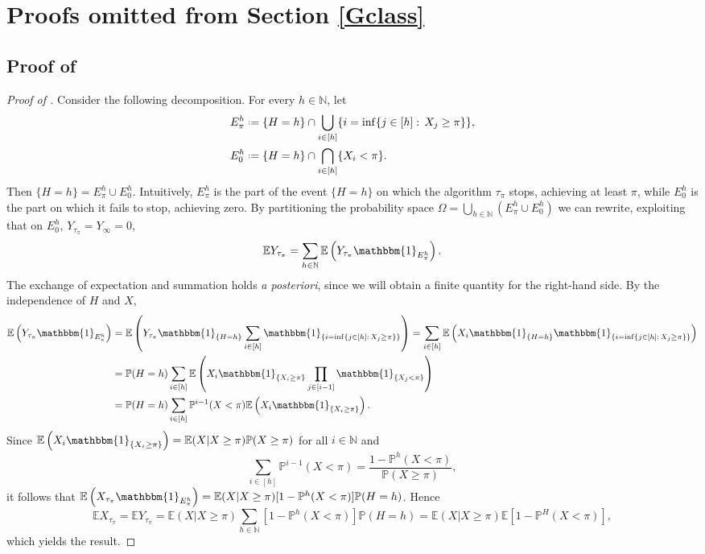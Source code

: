 \documentclass[11pt, a4paper, twoside]{article}
\newcommand*{\defeq}{\mathrel{\vcenter{\baselineskip0.5ex \lineskiplimit0pt
			\hbox{\scriptsize.}\hbox{\scriptsize.}}}=}
\newcommand{\NN}{\mathbb{N}}
\newcommand{\EE}{\mathbb{E}}
\newcommand{\PP}{\mathbb{P}}
\newcommand{\II}{\mathbbm{1}}
\numberwithin{equation}{section}
\begin{document}
	\section{Proofs omitted from Section \ref{Gclass}}\label{suppGclass}
	
	\subsection{Proof of }\label{suppGclassalgp}
	\begin{proof}[Proof of ]
		Consider the following decomposition. For every $h\in\NN$, let
		\begin{align*}
			E_\pi^h&\defeq \{H=h\}\cap\bigcup_{i\in[h]}\{i=\inf\{j\in[h]:\,X_j\ge \pi\}\},\\
			E_0^h&\defeq \{H=h\}\cap\bigcap_{i\in[h]}\{X_i<\pi\}.
		\end{align*}
		Then $\{H=h\}= E_\pi^h\cup E_0^h$. Intuitively, $E_\pi^h$ is the part of the event $\{H=h\}$ on which the algorithm $\tau_\pi$ stops, achieving at least $\pi$, while $E_0^h$ is the part on which it fails to stop, achieving zero. By partitioning the probability space $\Omega=\bigcup_{h\in\NN}(E_\pi^h\cup E_0^h)$ we can rewrite, exploiting that on $E_0^h$, $Y_{\tau_\pi}=Y_\infty =0$,  
		\[\EE Y_{\tau_\pi}=\sum_{h\in\NN}\EE\left( Y_{\tau_\pi}\II_{E_\pi^h}\right).\] 
		The exchange of expectation and summation holds \textit{a posteriori}, since we will obtain a finite quantity for the right-hand side. By the independence of $H$ and $X$,
		\begin{align*}
			\EE \left(Y_{\tau_\pi}\II_{E_\pi^h}\right)&=\EE\left( Y_{\tau_\pi}\II_{\{H=h\}}\sum_{i\in[h]}\II_{\{i=\inf\{j\in[h]:\,X_j\ge \pi\}\}}\right)=\sum_{i\in[h]}\EE\left( X_i\II_{\{H=h\}}\II_{\{i=\inf\{j\in[h]:\,X_j\ge \pi\}\}}\right)\\&=\PP(H=h)\sum_{i\in[h]}\EE \left(X_i\II_{\{X_i\ge \pi\}}\prod_{j\in[i-1]}\II_{\{X_j< \pi\}}\right)\\&=\PP(H=h)\sum_{i\in[h]}\PP^{i-1}(X<\pi)\EE \left(X_i\II_{\{X_i\ge \pi\}}\right).
		\end{align*}
		Since $\EE \left(X_i\II_{\{X_i\ge \pi\}}\right)=\EE(X|X\ge\pi)\PP(X\ge\pi)$ for all $i\in\NN$ and \[\sum_{i\in[h]}\PP^{i-1}(X<\pi)=\frac{1-\PP^h(X<\pi)}{\PP(X\ge\pi)},\]
		it follows that $\EE \left(X_{\tau_\pi}\II_{E_\pi^h}\right)=\EE(X|X\ge\pi)[1-\PP^h(X<\pi)]\PP(H=h)$.
		Hence \[\EE X_{\tau_\pi}=\EE Y_{\tau_\pi}=\EE(X|X\ge\pi)\sum_{h\in\NN}[1-\PP^h(X<\pi)]\PP(H=h)=\EE(X|X\ge\pi)\EE[1-\PP^H(X<\pi)],\] which yields the result.
	\end{proof}
	
\end{document}
